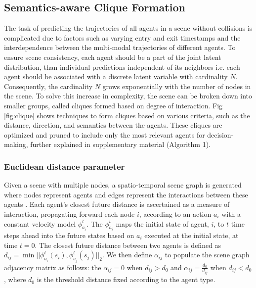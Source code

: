 \documentclass{article}
\begin{document}
\subsection{Semantics-aware Clique Formation}
The task of predicting the trajectories of all agents in a scene  without collisions is complicated due to factors such as varying entry and exit timestamps and the interdependence between the multi-modal trajectories of different agents. To ensure scene consistency, each agent should be a part of the joint latent distribution, than individual predictions independent of its neighbors i.e. each agent should be associated with a discrete latent variable with cardinality $N$. Consequently, the cardinality $N$ grows exponentially with the number of nodes in the scene. To solve this increase in complexity, the scene can be broken down into smaller groups, called cliques formed based on degree of interaction. Fig \ref{fig:clique} shows techniques to form cliques based on various criteria, such as the distance, direction, and semantics between the agents. These cliques are optimized and pruned to include only the most relevant agents for decision-making, further explained in supplementary material (Algorithm 1).%
\subsubsection{Euclidean distance parameter} 
Given a scene with multiple nodes, a spatio-temporal scene graph is generated where nodes represent agents and edges represent the interactions between these agents \cite{chen2022scept}. Each agent’s closest future distance is ascertained as a measure of interaction, propagating forward each node $i$, according to an action $a_i$ with a constant velocity model $\phi_{a_i}^t$. The $\phi_{a_i}^t$ maps the initial state of agent, $i$, to $t$ time steps ahead into the future states based on $a_i$ executed at the initial state, at time $t=0$. %
The closest future distance between two agents is defined as $d_{ij} = \min ||\phi_{a_i}^t(s_i), \phi_{a_j}^t(s_j)||_2$. We then define $\alpha_{ij}$ to populate the scene graph adjacency matrix as follows: the $\alpha_{ij} =0$ when $d_{ij} > d_0$ and $\alpha_{ij} =\frac{d_0}{d_{ij}}$ when $d_{ij} < d_0$, where $d_0$ is the threshold distance fixed according to the agent type. 
     
\end{document}
